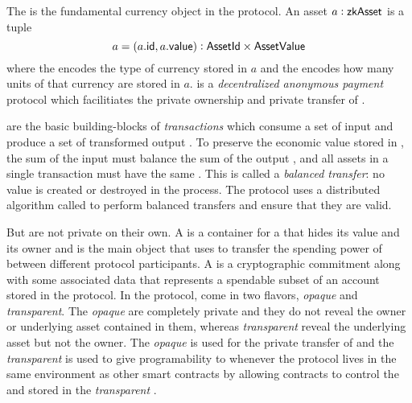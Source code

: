 

The \zkAsset{} is the fundamental currency object in the \MantaPay{} protocol. An asset $a : {\textsf{zkAsset}}$ is a tuple
\[a = (a.{\textsf{id}}, a.{\textsf{value}}) : {\textsf{AssetId}} \times {\textsf{AssetValue}}\]
where the \AssetId{} encodes the type of currency stored in $a$ and the \AssetValue{} encodes how many units of that currency are stored in $a$.  \MantaPay{} is a \emph{decentralized anonymous payment} protocol which facilitiates the private ownership and private transfer of . 

 are the basic building-blocks of \emph{transactions} which consume a set of input  and produce a set of transformed output . To preserve the economic value stored in , the sum of the input  must balance the sum of the output , and all assets in a single transaction must have the same \AssetId{}\footnotemark{}. This is called a \emph{balanced transfer}: no value is created or destroyed in the process. The \MantaPay{} protocol uses a distributed algorithm called \Transfer{} to perform balanced transfers and ensure that they are valid.


But  are not private on their own. A \UTXO{} is a container for a \zkAsset{} that hides its value and its owner and is the main object that \MantaPay{} uses to transfer the spending power of  between different protocol participants. A \UTXO{} is a cryptographic commitment along with some associated data that represents a spendable subset of an account stored in the protocol. In the \MantaPay{} protocol,  come in two flavors, \emph{opaque} and \emph{transparent}. The \emph{opaque}  are completely private and they do not reveal the owner or underlying asset contained in them, whereas \emph{transparent}  reveal the underlying asset but not the owner. The \emph{opaque} \UTXO{} is used for the private transfer of  and the \emph{transparent} \UTXO{} is used to give programability to  whenever the \MantaPay{} protocol lives in the same environment as other smart contracts by allowing contracts to control the \AssetId{} and \AssetValue{} stored in the \emph{transparent} \UTXO{}.

